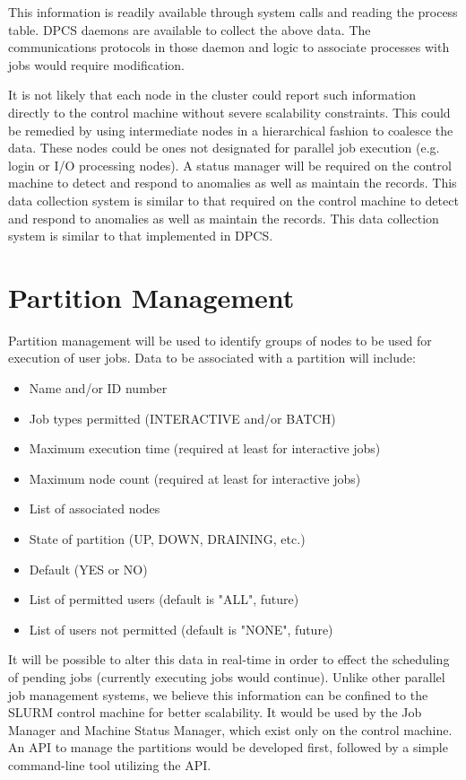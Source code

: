 This information is readily available through system calls and reading the
process table. DPCS daemons are available to collect the above data. The
communications protocols in those daemon and logic to associate processes with
jobs would require modification.

It is not likely that each node in the cluster could report such information
directly to the control machine without severe scalability constraints. This
could be remedied by using intermediate nodes in a hierarchical fashion to
coalesce the data. These nodes could be ones not designated for parallel job
execution (e.g. login or I/O processing nodes). A status manager will be
required on the control machine to detect and respond to anomalies as well as
maintain the records. This data collection system is similar to that
required on the control machine to detect and respond to anomalies as well as
maintain the records. This data collection system is similar to that
implemented in DPCS. 

\section{Partition Management}

Partition management will be used to identify groups of nodes to be used for
execution of user jobs. Data to be associated with a partition will include:
\begin{itemize}
\item Name and/or ID number
\item Job types permitted (INTERACTIVE and/or BATCH)
\item Maximum execution time (required at least for interactive jobs)
\item Maximum node count (required at least for interactive jobs)
\item List of associated nodes
\item State of partition (UP, DOWN, DRAINING, etc.)
\item Default (YES or NO)
\item List of permitted users (default is "ALL", future)
\item List of users not permitted (default is "NONE", future)
\end{itemize}

It will be possible to alter this data in real-time in order to effect the
scheduling of pending jobs (currently executing jobs would continue). Unlike
other parallel job management systems, we believe this information can be
confined to the SLURM control machine for better scalability. It would be used
by the Job Manager and Machine Status Manager, which exist only on the control
machine. An API to manage the partitions would be developed first, followed by
a simple command-line tool utilizing the API.

